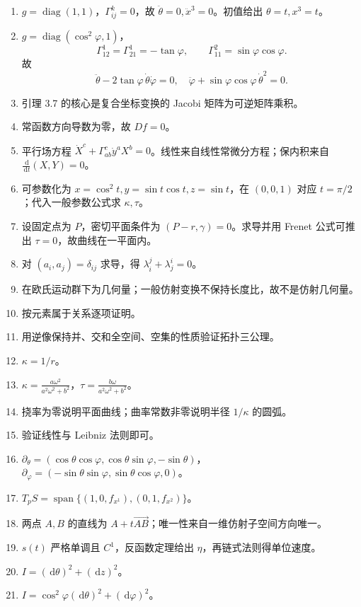 \documentclass[UTF8,12pt,a4paper]{ctexart}
\newcommand{\dd}{\,\mathrm d}
\newcommand{\inner}[2]{\left(#1,#2\right)}
\newcommand{\spn}{\operatorname{span}}
\begin{document}
\begin{enumerate}
\item $g=\operatorname{diag}(1,1)$，$\Gamma^k_{ij}=0$，故 $\ddot\theta=0,\ddot x^3=0$。初值给出 $\theta=t,x^3=t$。
\item $g=\operatorname{diag}(\cos^2\varphi,1)$，
\[
\Gamma^1_{12}=\Gamma^1_{21}=-\tan\varphi,\qquad
\Gamma^2_{11}=\sin\varphi\cos\varphi.
\]
故
\[
\ddot\theta-2\tan\varphi\,\dot\theta\dot\varphi=0,\quad
\ddot\varphi+\sin\varphi\cos\varphi\,\dot\theta^2=0.
\]
\item 引理 3.7 的核心是复合坐标变换的 Jacobi 矩阵为可逆矩阵乘积。
\item 常函数方向导数为零，故 $Df=0$。
\item 平行场方程 $\dot X^c+\Gamma^c_{ab}\dot y^aX^b=0$。线性来自线性常微分方程；保内积来自 $\frac{\dd}{\dd t}(X,Y)=0$。
\item 可参数化为 $x=\cos^2 t,y=\sin t\cos t,z=\sin t$，在 $(0,0,1)$ 对应 $t=\pi/2$；代入一般参数公式求 $\kappa,\tau$。
\item 设固定点为 $P$，密切平面条件为 $(P-r,\gamma)=0$。求导并用 Frenet 公式可推出 $\tau=0$，故曲线在一平面内。
\item 对 $\inner{a_i}{a_j}=\delta_{ij}$ 求导，得 $\lambda_i^j+\lambda_j^i=0$。
\item 在欧氏运动群下为几何量；一般仿射变换不保持长度比，故不是仿射几何量。
\item 按元素属于关系逐项证明。
\item 用逆像保持并、交和全空间、空集的性质验证拓扑三公理。
\item $\kappa=1/r$。
\item $\kappa=\frac{a\omega^2}{a^2\omega^2+b^2}$，$\tau=\frac{b\omega}{a^2\omega^2+b^2}$。
\item 挠率为零说明平面曲线；曲率常数非零说明半径 $1/\kappa$ 的圆弧。
\item 验证线性与 Leibniz 法则即可。
\item $\partial_\theta=(\cos\theta\cos\varphi,\cos\theta\sin\varphi,-\sin\theta)$，
$\partial_\varphi=(-\sin\theta\sin\varphi,\sin\theta\cos\varphi,0)$。
\item $T_pS=\spn\{(1,0,f_{x^1}),(0,1,f_{x^2})\}$。
\item 两点 $A,B$ 的直线为 $A+t\overrightarrow{AB}$；唯一性来自一维仿射子空间方向唯一。
\item $s(t)$ 严格单调且 $C^1$，反函数定理给出 $\eta$，再链式法则得单位速度。
\item $I=(\dd\theta)^2+(\dd z)^2$。
\item $I=\cos^2\varphi(\dd\theta)^2+(\dd\varphi)^2$。

\end{enumerate}
\end{document}
